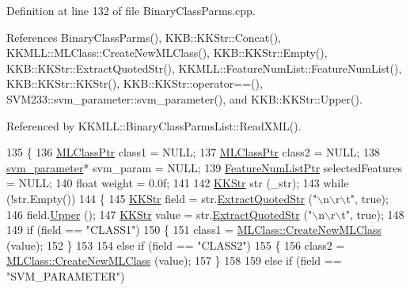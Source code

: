 Definition at line 132 of file Binary\+Class\+Parms.\+cpp.



References Binary\+Class\+Parms(), K\+K\+B\+::\+K\+K\+Str\+::\+Concat(), K\+K\+M\+L\+L\+::\+M\+L\+Class\+::\+Create\+New\+M\+L\+Class(), K\+K\+B\+::\+K\+K\+Str\+::\+Empty(), K\+K\+B\+::\+K\+K\+Str\+::\+Extract\+Quoted\+Str(), K\+K\+M\+L\+L\+::\+Feature\+Num\+List\+::\+Feature\+Num\+List(), K\+K\+B\+::\+K\+K\+Str\+::\+K\+K\+Str(), K\+K\+B\+::\+K\+K\+Str\+::operator==(), S\+V\+M233\+::svm\+\_\+parameter\+::svm\+\_\+parameter(), and K\+K\+B\+::\+K\+K\+Str\+::\+Upper().



Referenced by K\+K\+M\+L\+L\+::\+Binary\+Class\+Parms\+List\+::\+Read\+X\+M\+L().


\begin{DoxyCode}
135 \{
136   \hyperlink{class_k_k_m_l_l_1_1_m_l_class}{MLClassPtr}         class1    = NULL;
137   \hyperlink{class_k_k_m_l_l_1_1_m_l_class}{MLClassPtr}         class2    = NULL;
138   \hyperlink{struct_s_v_m233_1_1svm__parameter}{svm\_parameter}*     svm\_param = NULL;
139   \hyperlink{class_k_k_m_l_l_1_1_feature_num_list}{FeatureNumListPtr}  selectedFeatures = NULL;
140   \textcolor{keywordtype}{float}              weight    = 0.0f;
141 
142   \hyperlink{class_k_k_b_1_1_k_k_str}{KKStr}  str (\_str);
143   \textcolor{keywordflow}{while}  (!str.Empty())
144   \{
145     \hyperlink{class_k_k_b_1_1_k_k_str}{KKStr}  field = str.\hyperlink{class_k_k_b_1_1_k_k_str_a90b08420d7941d737e1f9c68dfb647a1}{ExtractQuotedStr} (\textcolor{stringliteral}{"\(\backslash\)n\(\backslash\)r\(\backslash\)t"}, \textcolor{keyword}{true});
146     field.\hyperlink{class_k_k_b_1_1_k_k_str_a66ea0feabc94da88591b56a683695bd9}{Upper} ();
147     \hyperlink{class_k_k_b_1_1_k_k_str}{KKStr}  value = str.\hyperlink{class_k_k_b_1_1_k_k_str_a90b08420d7941d737e1f9c68dfb647a1}{ExtractQuotedStr} (\textcolor{stringliteral}{"\(\backslash\)n\(\backslash\)r\(\backslash\)t"}, \textcolor{keyword}{true});
148 
149     \textcolor{keywordflow}{if}  (field == \textcolor{stringliteral}{"CLASS1"})
150     \{
151       class1 = \hyperlink{class_k_k_m_l_l_1_1_m_l_class_a9fd24c617c42d89afc92414575e00e9a}{MLClass::CreateNewMLClass} (value);
152     \}
153 
154     \textcolor{keywordflow}{else} \textcolor{keywordflow}{if}  (field == \textcolor{stringliteral}{"CLASS2"})
155     \{
156       class2 = \hyperlink{class_k_k_m_l_l_1_1_m_l_class_a9fd24c617c42d89afc92414575e00e9a}{MLClass::CreateNewMLClass} (value);
157     \}
158 
159     \textcolor{keywordflow}{else} \textcolor{keywordflow}{if}  (field == \textcolor{stringliteral}{"SVM\_PARAMETER"})

\end{DoxyCode}
